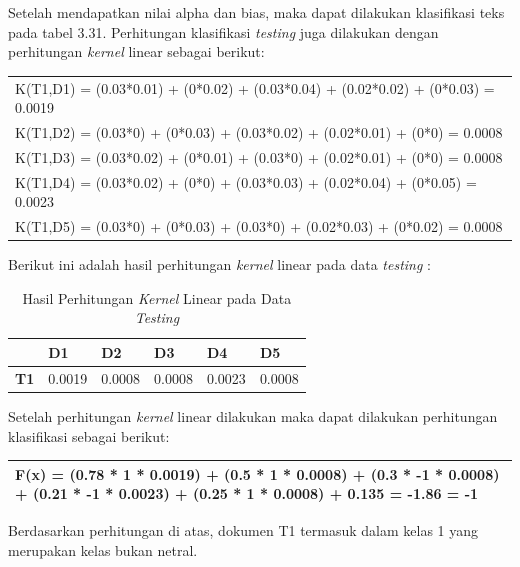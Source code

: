Setelah mendapatkan nilai alpha dan bias, maka dapat dilakukan klasifikasi teks pada tabel 3.31. Perhitungan klasifikasi \textit{testing} juga dilakukan dengan perhitungan \textit{kernel} linear sebagai berikut:
\begin{table}[H]
	\centering
	\small
	\begin{adjustbox}{width=1\textwidth}	
	\begin{tabular}{|p{13.55cm}|}
		\hline
		K(T1,D1) = (0.03*0.01) + (0*0.02) + (0.03*0.04) + (0.02*0.02) + (0*0.03) = 0.0019\\
		K(T1,D2) = (0.03*0) + (0*0.03) + (0.03*0.02) + (0.02*0.01) + 
		(0*0) = 0.0008\\
		K(T1,D3) = (0.03*0.02) + (0*0.01) + (0.03*0) + (0.02*0.01) 
		+ (0*0) = 0.0008\\
		K(T1,D4) = (0.03*0.02) + (0*0) + (0.03*0.03) + 
		(0.02*0.04) + (0*0.05) = 0.0023\\
		K(T1,D5) = (0.03*0) + (0*0.03) + (0.03*0) 
		+ (0.02*0.03) + (0*0.02) = 0.0008 \\
		\hline
	\end{tabular}
	\end{adjustbox}
\end{table}
\noindent Berikut ini adalah hasil perhitungan \textit{kernel }linear pada data \textit{testing} : 

\begin{table}[H]
	\caption{Hasil Perhitungan \textit{Kernel} Linear pada Data \textit{Testing}}
	\centering
	\small
	\begin{adjustbox}{width=1\textwidth}
	\begin{tabular}{|p{2cm}|p{2cm}|p{2cm}|p{1.9cm}|p{1.9cm}|p{1.5cm}|}
		\hline
		& \textbf{D1} & \textbf{D2} & \textbf{D3} & \textbf{D4} & \textbf{D5} \\
		\hline
		\textbf{T1} & 0.0019 & 0.0008 & 0.0008 & 0.0023 & 0.0008 \\
		\hline
	\end{tabular}
	\end{adjustbox}
\end{table}
\noindent Setelah perhitungan \textit{kernel} linear dilakukan maka dapat dilakukan perhitungan klasifikasi sebagai berikut:
\begin{table}[H]
	\centering
	\small
	\begin{adjustbox}{width=1\textwidth}	
	\begin{tabular}{|p{13.55cm}|}
		\hline
		F(x) = (0.78 * 1 * 0.0019) + (0.5 * 1 * 0.0008) + (0.3 * -1 * 0.0008) + (0.21 * -1 * 0.0023) + (0.25 * 1 * 0.0008) + 0.135 = -1.86 = -1 \\
		\hline
	\end{tabular}
	\end{adjustbox}
\end{table}
Berdasarkan perhitungan di atas, dokumen T1 termasuk dalam kelas 1 yang merupakan kelas bukan netral.
\pagebreak

